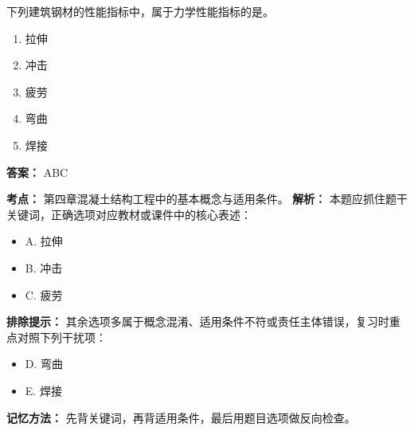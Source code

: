 \documentclass[UTF8,fontset=fandol,11pt]{ctexart}
\begin{document}
\vspace{0.2em}

\begin{quizbox}[title={第 6 题}]
下列建筑钢材的性能指标中，属于力学性能指标的是。\\
\begin{enumerate}[label=\Alph*.]
\item 拉伸
\item 冲击
\item 疲劳
\item 弯曲
\item 焊接
\end{enumerate}
\textbf{答案：} ABC
\vspace{0.25em}
\begin{answerbox}[title={考点解析}]
\textbf{考点：} 第四章混凝土结构工程中的基本概念与适用条件。
\textbf{解析：} 本题应抓住题干关键词，正确选项对应教材或课件中的核心表述：
\begin{itemize}
\item A. 拉伸
\item B. 冲击
\item C. 疲劳
\end{itemize}
\textbf{排除提示：} 其余选项多属于概念混淆、适用条件不符或责任主体错误，复习时重点对照下列干扰项：
\begin{itemize}
\item D. 弯曲
\item E. 焊接
\end{itemize}
\textbf{记忆方法：} 先背关键词，再背适用条件，最后用题目选项做反向检查。
\end{answerbox}
\end{quizbox}

\vspace{0.2em}
\end{document}
